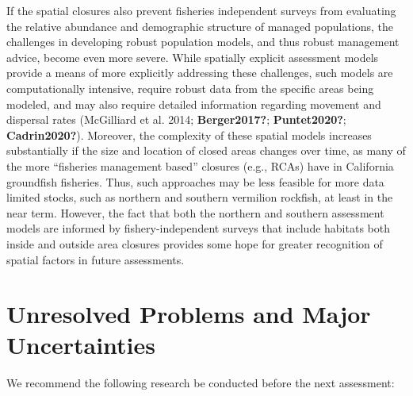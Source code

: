 \documentclass[
  english,
  a4paper,
]{article}
\begin{document}
If the spatial closures also prevent fisheries independent surveys from evaluating the relative abundance and demographic structure of managed populations, the challenges in developing robust population models, and thus robust management advice, become even more severe. While spatially explicit assessment models provide a means of more explicitly addressing these challenges, such models are computationally intensive, require robust data from the specific areas being modeled, and may also require detailed information regarding movement and dispersal rates (McGilliard et al. 2014; \textbf{Berger2017?}; \textbf{Puntet2020?}; \textbf{Cadrin2020?}). Moreover, the complexity of these spatial models increases substantially if the size and location of closed areas changes over time, as many of the more ``fisheries management based'' closures (e.g., RCAs) have in California groundfish fisheries. Thus, such approaches may be less feasible for more data limited stocks, such as northern and southern vermilion rockfish, at least in the near term. However, the fact that both the northern and southern assessment models are informed by fishery-independent surveys that include habitats both inside and outside area closures provides some hope for greater recognition of spatial factors in future assessments.

\hypertarget{unresolved-problems-and-major-uncertainties-2}{%
\section{Unresolved Problems and Major Uncertainties}\label{unresolved-problems-and-major-uncertainties-2}}

We recommend the following research be conducted before the next assessment:
\end{document}
